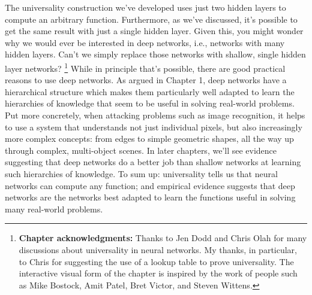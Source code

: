 The universality construction we've developed uses just two hidden layers to compute an arbitrary function. Furthermore, as we've discussed, it's possible to get the same result with just a single hidden layer. Given this, you might wonder why we would ever be interested in deep networks, i.e., networks with many hidden layers. Can't we simply replace those networks with shallow, single hidden layer networks? \footnote{\textbf{Chapter acknowledgments:} Thanks to Jen Dodd and Chris Olah for many discussions about universality in neural networks. My thanks, in particular, to Chris for suggesting the use of a lookup table to prove universality. The interactive visual form of the chapter is inspired by the work of people such as Mike Bostock, Amit Patel, Bret Victor, and Steven Wittens.} While in principle that's possible, there are good practical reasons to use deep networks. As argued in Chapter 1, deep networks have a hierarchical structure which makes them particularly well adapted to learn the hierarchies of knowledge that seem to be useful in solving real-world problems. Put more concretely, when attacking problems such as image recognition, it helps to use a system that understands not just individual pixels, but also increasingly more complex concepts: from edges to simple geometric shapes, all the way up through complex, multi-object scenes. In later chapters, we'll see evidence suggesting that deep networks do a better job than shallow networks at learning such hierarchies of knowledge. To sum up: universality tells us that neural networks can compute any function; and empirical evidence suggests that deep networks are the networks best adapted to learn the functions useful in solving many real-world problems.
